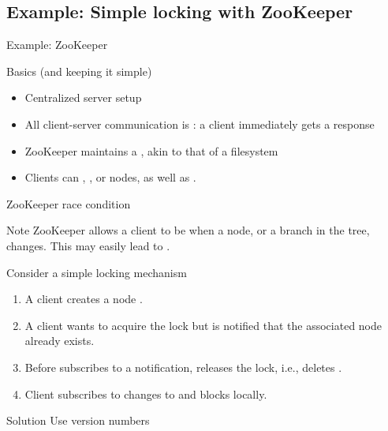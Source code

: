 \subsection{Example: Simple locking with ZooKeeper}
\begin{slide}{Example: ZooKeeper}
  \begin{block}{Basics (and keeping it simple)}
    \begin{itemize}\firmlist
    \item Centralized server setup
    \item All client-server communication is : a client immediately gets a response
    \item ZooKeeper maintains a , akin to that of a filesystem
    \item Clients can , , or  nodes, as well as . 
    \end{itemize}
  \end{block}
\end{slide}
\begin{slide}{ZooKeeper race condition}
  \begin{alertblock}{Note}
    ZooKeeper allows a client to be  when a node, or a branch in the tree, changes. This may
    easily lead to . 
  \end{alertblock}

  \begin{exampleblock}{Consider a simple locking mechanism}
    \begin{enumerate}\firmlist
    \item A client  creates a node .
    \item A client  wants to acquire the lock but is notified that the associated node already exists.
    \item Before  subscribes to a notification,  releases the lock, i.e., deletes .
    \item Client  subscribes to changes to  and blocks locally.
    \end{enumerate}
  \end{exampleblock}

  \begin{alertblock}{Solution}
    Use version numbers
  \end{alertblock}
\end{slide}
